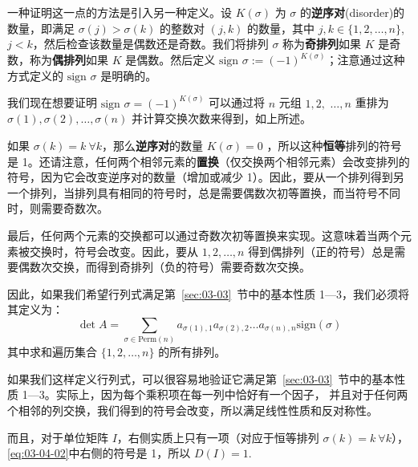 一种证明这一点的方法是引入另一种定义。设 $K(\sigma)$ 为 $\sigma$ 的\textbf{逆序对}(disorder)的数量，即满足 $\sigma(j) > \sigma(k)$ 的整数对 $(j, k)$ 的数量，其中 $j, k \in \{1, 2, \dots, n\}$, $j < k$，然后检查该数量是偶数还是奇数。我们将排列 $\sigma$ 称为\textbf{奇排列}如果 $K$ 是奇数，称为\textbf{偶排列}如果 $K$ 是偶数。然后定义 $\text{sign } \sigma := (-1)^{K(\sigma)}$；注意通过这种方式定义的 $\text{sign } \sigma$ 是明确的。

我们现在想要证明 $\text{sign } \sigma = (-1)^{K(\sigma)}$ 可以通过将 $n$ 元组 $1, 2, $ $\dots, n$ 重排为 $\sigma(1), \sigma(2), \dots, \sigma(n)$ 并计算交换次数来得到，如上所述。

如果 $\sigma(k) = k \ \forall k$，那么\textbf{逆序对}的数量 $K(\sigma) = 0$ ，所以这种\textbf{恒等}排列的符号是 1。还请注意，任何两个相邻元素的\textbf{置换}（仅交换两个相邻元素）会改变排列的符号，因为它会改变逆序对的数量（增加或减少 1）。因此，要从一个排列得到另一个排列，当排列具有相同的符号时，总是需要偶数次初等置换，而当符号不同时，则需要奇数次。

最后，任何两个元素的交换都可以通过奇数次初等置换来实现。这意味着当两个元素被交换时，符号会改变。因此，要从 $1, 2, \dots, n$ 得到偶排列（正的符号）总是需要偶数次交换，而得到奇排列（负的符号）需要奇数次交换。

因此，如果我们希望行列式满足第~\ref{sec:03-03}~节中的基本性质 1—3，我们必须将其定义为：
\begin{equation}\label{eq:03-04-02}
\det A = \sum_{\sigma \in \text{Perm}(n)} a_{\sigma(1),1} a_{\sigma(2),2} \dots a_{\sigma(n),n} \text{sign}(\sigma)
\end{equation}
其中求和遍历集合 $\{1, 2, \dots, n\}$ 的所有排列。

如果我们这样定义行列式，可以很容易地验证它满足第~\ref{sec:03-03}~节中的基本性质 1—3。实际上，因为每个乘积项在每一列中恰好有一个因子，
并且对于任何两个相邻的列交换，我们得到的符号会改变，所以满足线性性质和反对称性。

而且，对于单位矩阵 $I$，右侧实质上只有一项（对应于恒等排列 $\sigma(k)=k \ \forall k$），\eqref{eq:03-04-02}中右侧的符号是 1，所以 $D(I)=1$.~


